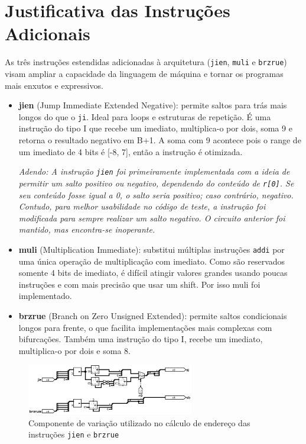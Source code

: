 \documentclass[12pt]{article}
\begin{document}
\section{Justificativa das Instruções Adicionais}

As três instruções estendidas adicionadas à arquitetura (\texttt{jien}, \texttt{muli} e \texttt{brzrue}) visam ampliar a capacidade da linguagem de máquina e tornar os programas mais enxutos e expressivos.

\begin{itemize}
  \item \textbf{jien} (Jump Immediate Extended Negative): permite saltos para trás mais longos do que o \texttt{ji}. Ideal para loops e estruturas de repetição. É uma instrução do tipo I que recebe um imediato, multiplica-o por dois, soma 9 e retorna o resultado negativo em B+1. A soma com 9 acontece pois o range de um imediato de 4 bits é [-8, 7], então a instrução é otimizada.

  \textit{Adendo: A instrução \texttt{jien} foi primeiramente implementada com a ideia de permitir um salto positivo ou negativo, dependendo do conteúdo de \texttt{r[0]}. Se seu conteúdo fosse igual a 0, o salto seria positivo; caso contrário, negativo. Contudo, para melhor usabilidade no código de teste, a instrução foi modificada para sempre realizar um salto negativo. O circuito anterior foi mantido, mas encontra-se inoperante.}

  \item \textbf{muli} (Multiplication Immediate): substitui múltiplas instruções \texttt{addi} por uma única operação de multiplicação com imediato. Como são reservados somente 4 bits de imediato, é difícil atingir valores grandes usando poucas instruções e com mais precisão que usar um shift. Por isso muli foi implementado.
  \item \textbf{brzrue} (Branch on Zero Unsigned Extended): permite saltos condicionais longos para frente, o que facilita implementações mais complexas com bifurcações. Também uma instrução do tipo I, recebe um imediato, multiplica-o por dois e soma 8.
\end{itemize}

\begin{figure}[H]
\centering
\includegraphics[width=0.65\textwidth]{images/variation_component.png}
\caption{Componente de variação utilizado no cálculo de endereço das instruções \texttt{jien} e \texttt{brzrue}}
\label{fig:variation}
\end{figure}
\end{document}
